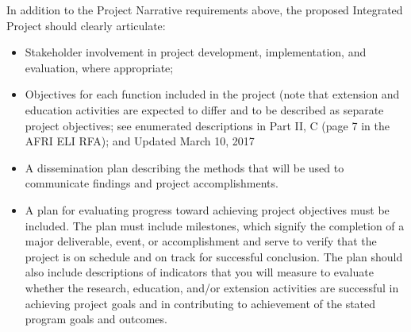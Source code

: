 \documentclass[12pt,letterpaper]{article}
\begin{document}
In addition to the Project Narrative requirements above, the proposed
Integrated Project should clearly articulate:

\begin{itemize}

  \item Stakeholder involvement in project development, implementation, and
   evaluation, where appropriate;

  \item Objectives for each function included in the project (note that extension
   and education activities are expected to differ and to be described as
   separate project objectives; see enumerated descriptions in Part II, C
   (page 7 in the AFRI ELI RFA); and Updated March 10, 2017

  \item A dissemination plan describing the methods that will be used to
   communicate findings and project accomplishments.

  \item A plan for evaluating progress toward achieving project objectives must be
   included. The plan must include milestones, which signify the completion of
   a major deliverable, event, or accomplishment and serve to verify that the
   project is on schedule and on track for successful conclusion. The plan
   should also include descriptions of indicators that you will measure to
   evaluate whether the research, education, and/or extension activities are
   successful in achieving project goals and in contributing to achievement of
   the stated program goals and outcomes.

\end{itemize}



\newpage
\AtBeginShipout{%
\AtBeginShipoutDiscard
}

\printbibliography
\end{document}
